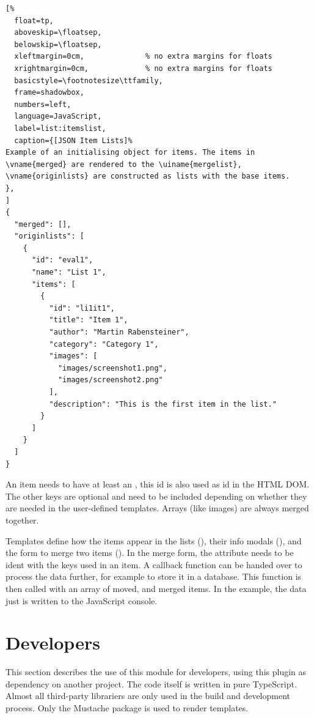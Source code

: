 \begin{samepage}
\begin{lstlisting}[%
  float=tp,
  aboveskip=\floatsep,
  belowskip=\floatsep,
  xleftmargin=0cm,              % no extra margins for floats
  xrightmargin=0cm,             % no extra margins for floats
  basicstyle=\footnotesize\ttfamily,
  frame=shadowbox,
  numbers=left,
  language=JavaScript,
  label=list:itemslist,
  caption={[JSON Item Lists]%
Example of an initialising object for items. The items in \vname{merged} are rendered to the \uiname{mergelist}, \vname{originlists} are constructed as lists with the base items.
},
]
{
  "merged": [],
  "originlists": [
    {
      "id": "eval1",
      "name": "List 1",
      "items": [
        {
          "id": "li1it1",
          "title": "Item 1",
          "author": "Martin Rabensteiner",
          "category": "Category 1",
          "images": [
            "images/screenshot1.png",
            "images/screenshot2.png"
          ],
          "description": "This is the first item in the list."
        }
      ]
    }
  ]
}

\end{lstlisting}
\end{samepage}

An item needs to have at least an , this id is also used as id
in the HTML DOM. The other keys are optional and need to be included
depending on whether they are needed in the user-defined templates.
Arrays (like images) are always merged together.

Templates define how the items appear in the lists
(), their info modals (),
and the form to merge two items (). In the merge
form, the  attribute needs to be ident with the keys used in
an item. A callback function can be handed over to process the data
further, for example to store it in a database. This function is then
called with an array of moved, and merged items. In the example, the
data just is written to the JavaScript console.





\section{Developers}

This section describes the use of this module for developers, using this
plugin as dependency on another project. The code itself is written in
pure TypeScript. Almost all third-party librariers are only used in the
build and development process. Only the Mustache package is used to
render templates.


